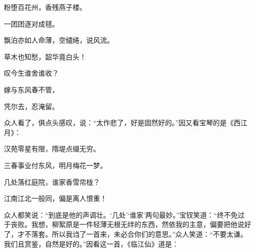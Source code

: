 \begin{poem}
    \begin{pl}粉堕百花州，香残燕子楼。\end{pl}

    \begin{pl}一团团逐对成毬。\end{pl}

    \begin{pl}飘泊亦如人命薄，空缱绻，说风流。\end{pl}

    \begin{pl}草木也知愁，韶华竟白头！\end{pl}

    \begin{pl}叹今生谁舍谁收？\end{pl}

    \begin{pl}嫁与东风春不管，\end{pl}

    \begin{pl}凭尔去，忍淹留。\end{pl}

\end{poem}


\begin{parag}
    众人看了，俱点头感叹，说：“太作悲了，好是固然好的。”因又看宝琴的是《西江月》：
\end{parag}


\begin{poem}
    \begin{pl}汉苑零星有限，隋堤点缀无穷。\end{pl}

    \begin{pl}三春事业付东风，明月梅花一梦。\end{pl}

    \begin{pl}几处落红庭院，谁家香雪帘栊？\end{pl}

    \begin{pl}江南江北一般同，偏是离人恨重！\end{pl}

\end{poem}


\begin{parag}
    众人都笑说：“到底是他的声调壮。‘几处’‘谁家’两句最妙。”宝钗笑道：“终不免过于丧败。我想，柳絮原是一件轻薄无根无绊的东西，然依我的主意，偏要把他说好了，才不落套。所以我诌了一首来，未必合你们的意思。”众人笑道：“不要太谦。我们且赏鉴，自然是好的。”因看这一首，《临江仙》道是：
\end{parag}


